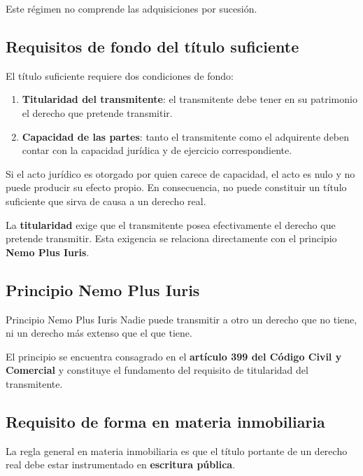 \documentclass[12pt,oneside]{book}
\begin{document}
Este régimen no comprende las adquisiciones por sucesión.

\subsection{Requisitos de fondo del título suficiente}

El título suficiente requiere dos condiciones de fondo:

\begin{enumerate}
    \item \textbf{Titularidad del transmitente}: el transmitente debe tener en su patrimonio el derecho que pretende transmitir.
    \item \textbf{Capacidad de las partes}: tanto el transmitente como el adquirente deben contar con la capacidad jurídica y de ejercicio correspondiente.
\end{enumerate}

Si el acto jurídico es otorgado por quien carece de capacidad, el acto es nulo y no puede producir su efecto propio. En consecuencia, no puede constituir un título suficiente que sirva de causa a un derecho real.

\begin{important}
La \textbf{titularidad} exige que el transmitente posea efectivamente el derecho que pretende transmitir. Esta exigencia se relaciona directamente con el principio \textbf{Nemo Plus Iuris}.
\end{important}

\subsection{Principio Nemo Plus Iuris}

\begin{definition}{Principio Nemo Plus Iuris}
Nadie puede transmitir a otro un derecho que no tiene, ni un derecho más extenso que el que tiene.
\end{definition}

El principio se encuentra consagrado en el \textbf{artículo 399 del Código Civil y Comercial} y constituye el fundamento del requisito de titularidad del transmitente.

\subsection{Requisito de forma en materia inmobiliaria}

La regla general en materia inmobiliaria es que el título portante de un derecho real debe estar instrumentado en \textbf{escritura pública}.
\end{document}
